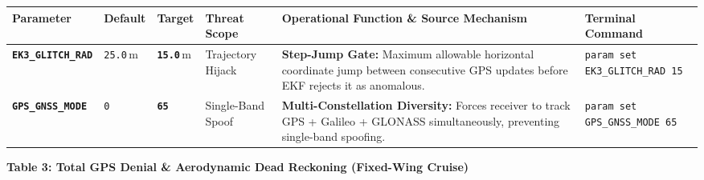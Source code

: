 \documentclass[10pt,letterpaper]{article}
\begin{document}
\noindent
\footnotesize
\renewcommand{\arraystretch}{1.2}
\begin{tabularx}{\textwidth}{L{0.18\textwidth} C{0.07\textwidth} C{0.08\textwidth} L{0.14\textwidth} Y L{0.25\textwidth}}
\toprule
{}
\textbf{Parameter} & \textbf{Default} & \textbf{Target} & \textbf{Threat Scope} & \textbf{Operational Function \& Source Mechanism} & \textbf{Terminal Command} \\
\midrule
\texttt{\bfseries EK3\_GLITCH\_RAD} & \texttt{25.0}\,m & \texttt{\bfseries 15.0}\,m & Trajectory Hijack & 
\textbf{Step-Jump Gate:} Maximum allowable horizontal coordinate jump between consecutive GPS updates before EKF rejects it as anomalous. & 
\texttt{\scriptsize\color{cmdgreen}param set EK3\_GLITCH\_RAD 15} \\
\texttt{\bfseries GPS\_GNSS\_MODE} & \texttt{0} & \texttt{\bfseries 65} & Single-Band Spoof & 
\textbf{Multi-Constellation Diversity:} Forces receiver to track GPS + Galileo + GLONASS simultaneously, preventing single-band spoofing. & 
\texttt{\scriptsize\color{cmdgreen}param set GPS\_GNSS\_MODE 65} \\
\bottomrule
\end{tabularx}

\vspace{3.5mm}
\noindent\textbf{\normalsize Table 3: Total GPS Denial \& Aerodynamic Dead Reckoning (Fixed-Wing Cruise)}
\vspace{0.8mm}
\end{document}
